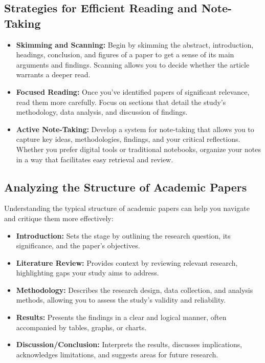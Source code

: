 \documentclass[
]{book}
\begin{document}
\hypertarget{strategies-for-efficient-reading-and-note-taking}{%
\subsection*{Strategies for Efficient Reading and Note-Taking}\label{strategies-for-efficient-reading-and-note-taking}}

\begin{itemize}
\item
  \textbf{Skimming and Scanning:} Begin by skimming the abstract, introduction, headings, conclusion, and figures of a paper to get a sense of its main arguments and findings. Scanning allows you to decide whether the article warrants a deeper read.
\item
  \textbf{Focused Reading:} Once you've identified papers of significant relevance, read them more carefully. Focus on sections that detail the study's methodology, data analysis, and discussion of findings.
\item
  \textbf{Active Note-Taking:} Develop a system for note-taking that allows you to capture key ideas, methodologies, findings, and your critical reflections. Whether you prefer digital tools or traditional notebooks, organize your notes in a way that facilitates easy retrieval and review.
\end{itemize}

\hypertarget{analyzing-the-structure-of-academic-papers}{%
\subsection*{Analyzing the Structure of Academic Papers}\label{analyzing-the-structure-of-academic-papers}}

Understanding the typical structure of academic papers can help you navigate and critique them more effectively:

\begin{itemize}
\item
  \textbf{Introduction:} Sets the stage by outlining the research question, its significance, and the paper's objectives.
\item
  \textbf{Literature Review:} Provides context by reviewing relevant research, highlighting gaps your study aims to address.
\item
  \textbf{Methodology:} Describes the research design, data collection, and analysis methods, allowing you to assess the study's validity and reliability.
\item
  \textbf{Results:} Presents the findings in a clear and logical manner, often accompanied by tables, graphs, or charts.
\item
  \textbf{Discussion/Conclusion:} Interprets the results, discusses implications, acknowledges limitations, and suggests areas for future research.
\end{itemize}
\end{document}
